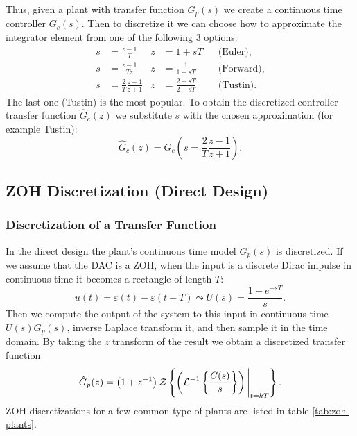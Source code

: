 Thus, given a plant with transfer function \(G_p(s)\) we create a continuous time controller \(G_c(s)\). Then to discretize it we can choose how to approximate the integrator element from one of the following 3 options:
\begin{align*}
	s & = \frac{z - 1}{T}                & z & = 1 + sT                && \text{(Euler)},   \\
	s & = \frac{z - 1}{Tz}               & z & = \frac{1}{1 - sT}      && \text{(Forward)}, \\
	s & = \frac{2}{T}\frac{z - 1}{z + 1} & z & = \frac{2 + sT}{2 - sT} && \text{(Tustin)}.
\end{align*}
The last one (Tustin) is the most popular. To obtain the discretized controller transfer function \(\hat{G}_c(z)\) we substitute \(s\) with the chosen approximation (for example Tustin):
\[
	\hat{G}_c(z) = G_c \left(s = \frac{2}{T} \frac{z - 1}{z + 1}\right).
\]


\subsection{ZOH Discretization (Direct Design)}

\subsubsection{Discretization of a Transfer Function}

In the direct design the plant's continuous time model \(G_p(s)\) is discretized. If we assume that the DAC is a ZOH, when the input is a discrete Dirac impulse in continuous time it becomes a rectangle of length \(T\):
\[
	u(t) = \varepsilon(t) - \varepsilon(t - T)
	\leadsto U(s) = \frac{1 - e^{-sT}}{s}.
\]
Then we compute the output of the system to this input in continuous time \(U(s)G_p(s)\), inverse Laplace transform it, and then sample it in the time domain. By taking the \(z\) transform of the result we obtain a discretized transfer function 
\[
	\hat{G}_p(z) = \left( 1 + z^{-1} \right) \operatorname{\mathcal{Z}} \left\{
		\left( \operatorname{\mathcal{L}}^{-1} \left\{
			\frac{G(s)}{s} \right\}
		\right) \Bigg |_{t = kT}
	\right\}.
\]
ZOH discretizations for a few common type of plants are listed in table \ref{tab:zoh-plants}.


